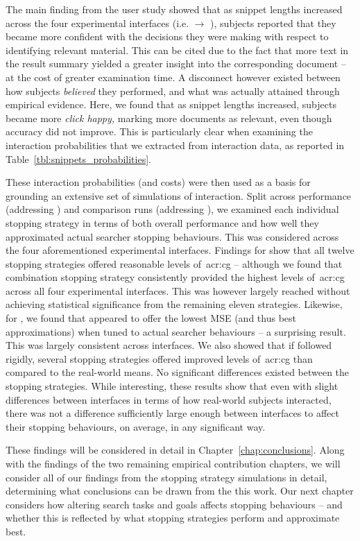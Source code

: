 The main finding from the user study showed that as snippet lengths increased across the four experimental interfaces (i.e.  $\rightarrow$ ), subjects reported that they became more confident with the decisions they were making with respect to identifying relevant material. This can be cited due to the fact that more text in the result summary yielded a greater insight into the corresponding document -- at the cost of greater examination time. A disconnect however existed between how subjects \emph{believed} they performed, and what was actually attained through empirical evidence. Here, we found that as snippet lengths increased, subjects became more \emph{click happy,} marking more documents as relevant, even though accuracy did not improve. This is particularly clear when examining the interaction probabilities that we extracted from interaction data, as reported in Table~\ref{tbl:snippets_probabilities}.

These interaction probabilities (and costs) were then used as a basis for grounding an extensive set of simulations of interaction. Split across performance (addressing ) and comparison runs (addressing ), we examined each individual stopping strategy in terms of both overall performance and how well they approximated actual searcher stopping behaviours. This was considered across the four aforementioned experimental interfaces. Findings for  show that all twelve stopping strategies offered reasonable levels of~\gls{acr:cg} -- although we found that combination stopping strategy  consistently provided the highest levels of~\gls{acr:cg} across all four experimental interfaces. This was however largely reached without achieving statistical significance from the remaining eleven strategies. Likewise, for , we found that  appeared to offer the lowest MSE (and thus best approximations) when tuned to actual searcher behaviours -- a surprising result. This was largely consistent across interfaces. We also showed that if followed rigidly, several stopping strategies offered improved levels of~\gls{acr:cg} than compared to the real-world means. No significant differences existed between the stopping strategies. While interesting, these results show that even with slight differences between interfaces in terms of how real-world subjects interacted, there was not a difference sufficiently large enough between interfaces to affect their stopping behaviours, on average, in any significant way.

These findings will be considered in detail in Chapter~\ref{chap:conclusions}. Along with the findings of the two remaining empirical contribution chapters, we will consider all of our findings from the stopping strategy simulations in detail, determining what conclusions can be drawn from the this work. Our next chapter considers how altering search tasks and goals affects stopping behaviours -- and whether this is reflected by what stopping strategies perform and approximate best.

\newpage
\thispagestyle{empty}
\mbox{}